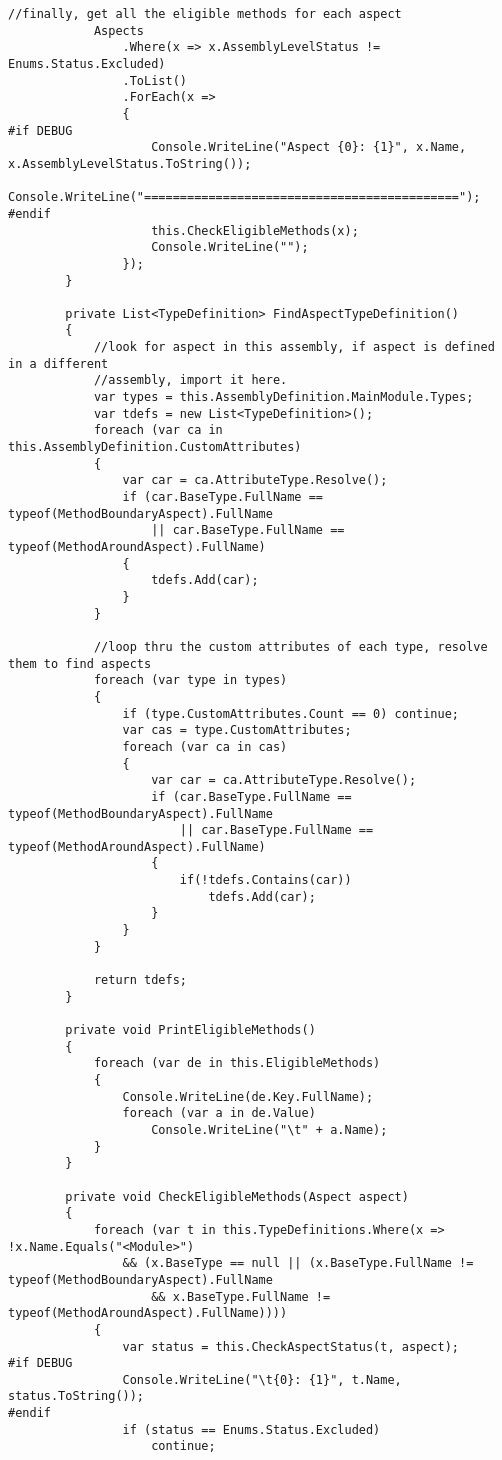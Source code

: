 \begin{lstlisting}[caption={../buffalo/Weaver.cs}, label=../buffalo/Weaver.cs, frame=tb, basicstyle=\scriptsize]
            //finally, get all the eligible methods for each aspect
            Aspects
                .Where(x => x.AssemblyLevelStatus != Enums.Status.Excluded)
                .ToList()
                .ForEach(x =>
                {
#if DEBUG
                    Console.WriteLine("Aspect {0}: {1}", x.Name, x.AssemblyLevelStatus.ToString());
                    Console.WriteLine("============================================");
#endif
                    this.CheckEligibleMethods(x);
                    Console.WriteLine("");
                });
        }

        private List<TypeDefinition> FindAspectTypeDefinition()
        {
            //look for aspect in this assembly, if aspect is defined in a different
            //assembly, import it here.
            var types = this.AssemblyDefinition.MainModule.Types;
            var tdefs = new List<TypeDefinition>();
            foreach (var ca in this.AssemblyDefinition.CustomAttributes)
            {
                var car = ca.AttributeType.Resolve();
                if (car.BaseType.FullName == typeof(MethodBoundaryAspect).FullName
                    || car.BaseType.FullName == typeof(MethodAroundAspect).FullName)
                {
                    tdefs.Add(car);
                }
            }

            //loop thru the custom attributes of each type, resolve them to find aspects
            foreach (var type in types)
            {
                if (type.CustomAttributes.Count == 0) continue;
                var cas = type.CustomAttributes;
                foreach (var ca in cas)
                {
                    var car = ca.AttributeType.Resolve();
                    if (car.BaseType.FullName == typeof(MethodBoundaryAspect).FullName
                        || car.BaseType.FullName == typeof(MethodAroundAspect).FullName)
                    {
                        if(!tdefs.Contains(car))
                            tdefs.Add(car);
                    }
                }
            }

            return tdefs;
        }

        private void PrintEligibleMethods()
        {
            foreach (var de in this.EligibleMethods)
            {
                Console.WriteLine(de.Key.FullName);
                foreach (var a in de.Value)
                    Console.WriteLine("\t" + a.Name);
            }
        }

        private void CheckEligibleMethods(Aspect aspect)
        {
            foreach (var t in this.TypeDefinitions.Where(x => !x.Name.Equals("<Module>")
                && (x.BaseType == null || (x.BaseType.FullName != typeof(MethodBoundaryAspect).FullName
                    && x.BaseType.FullName != typeof(MethodAroundAspect).FullName))))
            {
                var status = this.CheckAspectStatus(t, aspect);
#if DEBUG
                Console.WriteLine("\t{0}: {1}", t.Name, status.ToString());
#endif
                if (status == Enums.Status.Excluded)
                    continue;


\end{lstlisting}
